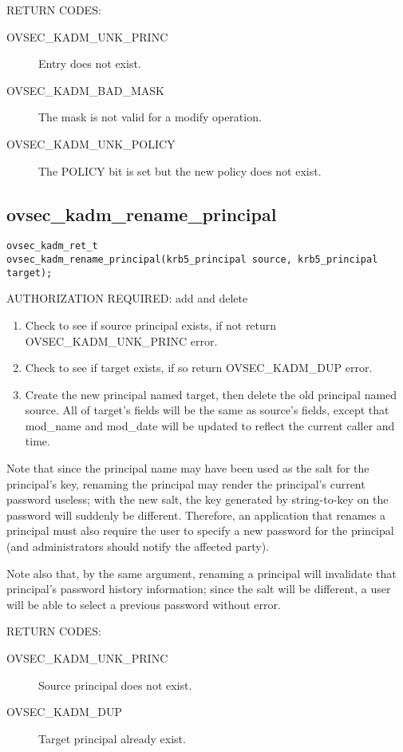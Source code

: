 RETURN CODES:

\begin{description}
\item[OVSEC_KADM_UNK_PRINC] Entry does not exist.
\item[OVSEC_KADM_BAD_MASK] The mask is not valid for a modify
operation.
\item[OVSEC_KADM_UNK_POLICY] The POLICY bit is set but the new
policy does not exist.
\end{description}

\subsection{ovsec_kadm_rename_principal}

\begin{verbatim}
ovsec_kadm_ret_t
ovsec_kadm_rename_principal(krb5_principal source, krb5_principal target);
\end{verbatim}

AUTHORIZATION REQUIRED: add and delete

\begin{enumerate}
\item Check to see if source principal exists, if not return
OVSEC_KADM_UNK_PRINC error. 
\item Check to see if target exists, if so return OVSEC_KADM_DUP error.
\item Create the new principal named target, then delete the old
principal named source.  All of target's fields will be the same as
source's fields, except that mod_name and mod_date will be updated to
reflect the current caller and time.
\end{enumerate}

Note that since the principal name may have been used as the salt for
the principal's key, renaming the principal may render the principal's
current password useless; with the new salt, the key generated by
string-to-key on the password will suddenly be different.  Therefore,
an application that renames a principal must also require the user to
specify a new password for the principal (and administrators should
notify the affected party).

Note also that, by the same argument, renaming a principal will
invalidate that principal's password history information; since the
salt will be different, a user will be able to select a previous
password without error.

RETURN CODES: 

\begin{description}
\item[OVSEC_KADM_UNK_PRINC] Source principal does not exist.
\item[OVSEC_KADM_DUP] Target principal already exist.
\end{description}

